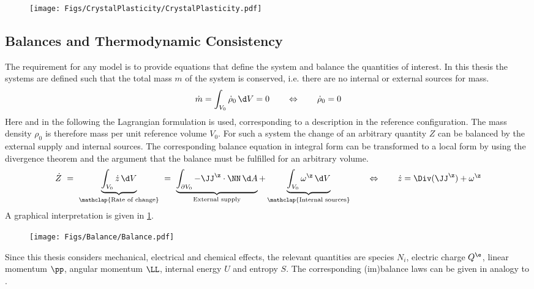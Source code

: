 \begin{figure}[h!]
  \centering
  \texttt{[image: Figs/CrystalPlasticity/CrystalPlasticity.pdf]}
\end{figure}

\subsection{Balances and Thermodynamic Consistency}
The requirement for any model is to provide equations that define the system and balance the quantities of interest. In this thesis the systems are defined such that the total mass $m$ of the system is conserved, i.e. there are no internal or external sources for mass. 
\begin{align}
  \dot m = \intVO \dot\rho_0 \dV = 0 \qquad \Leftrightarrow \qquad \dot\rho_0 = 0
\end{align}
Here and in the following the Lagrangian formulation is used, corresponding to a description in the reference configuration. The mass density $\rho_0$ is therefore mass per unit reference volume $V_0$. For such a system the change of an arbitrary quantity $Z$ can be balanced by the external supply and internal sources. The corresponding balance equation in integral form can be transformed to a local form by using the divergence theorem and the argument that the balance must be fulfilled for an arbitrary volume.  
\begin{align}
  \dot Z  \ = \ \underbrace{ \intVO \dot z \dV}_{\mathclap{\text{Rate of change}}} \ = \ \underbrace{\intdVO -\JJ^{\z} \cdot \NN\dA}_{\text{External supply}} + \underbrace{\intVO \omega^{\z} \dV}_{\mathclap{\text{Internal sources}}} 
  \qquad \Leftrightarrow \qquad \dot z = \Div(\JJ^{\z}) + \omega^{\z}
  \label{eq:balanceZ}
\end{align}
A graphical interpretation is given in \cref{fig:Balance}.
\begin{figure}[h!]
  \centering
  \texttt{[image: Figs/Balance/Balance.pdf]}
  \caption[]{}
  \label{fig:Balance}
\end{figure}

Since this thesis considers mechanical, electrical and chemical effects, the relevant quantities are species $N_i$, electric charge $Q^\e$, linear momentum $\pp$, angular momentum $\LL$, internal energy $U$ and entropy $S$. The corresponding (im)balance laws can be given in analogy to .


